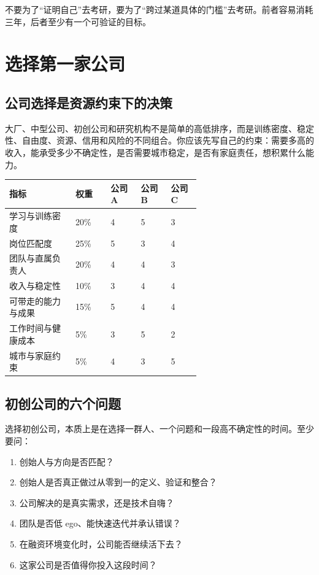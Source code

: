 \documentclass[UTF8,zihao=5,openany]{ctexbook}
\begin{document}
不要为了“证明自己”去考研，要为了“跨过某道具体的门槛”去考研。前者容易消耗三年，后者至少有一个可验证的目标。


\section{选择第一家公司}
\subsection{公司选择是资源约束下的决策}
大厂、中型公司、初创公司和研究机构不是简单的高低排序，而是训练密度、稳定性、自由度、资源、信用和风险的不同组合。你应该先写自己的约束：需要多高的收入，能承受多少不确定性，是否需要城市稳定，是否有家庭责任，想积累什么能力。

\begin{toolbox}
\begin{center}\footnotesize
\begin{tabularx}{0.94\linewidth}{p{0.22\linewidth}p{0.10\linewidth}p{0.10\linewidth}p{0.10\linewidth}p{0.10\linewidth}}
\toprule
指标 & 权重 & 公司 A & 公司 B & 公司 C \\
\midrule
学习与训练密度 & 20\% & 4 & 5 & 3 \\
岗位匹配度 & 25\% & 5 & 3 & 4 \\
团队与直属负责人 & 20\% & 4 & 4 & 3 \\
收入与稳定性 & 10\% & 3 & 4 & 4 \\
可带走的能力与成果 & 15\% & 5 & 4 & 4 \\
工作时间与健康成本 & 5\% & 3 & 5 & 2 \\
城市与家庭约束 & 5\% & 4 & 3 & 5 \\
\bottomrule
\end{tabularx}
\end{center}
\end{toolbox}

\subsection{初创公司的六个问题}
选择初创公司，本质上是在选择一群人、一个问题和一段高不确定性的时间。至少要问：
\begin{enumerate}
\item 创始人与方向是否匹配？
\item 创始人是否真正做过从零到一的定义、验证和整合？
\item 公司解决的是真实需求，还是技术自嗨？
\item 团队是否低 ego、能快速迭代并承认错误？
\item 在融资环境变化时，公司能否继续活下去？
\item 这家公司是否值得你投入这段时间？
\end{enumerate}
\end{document}
